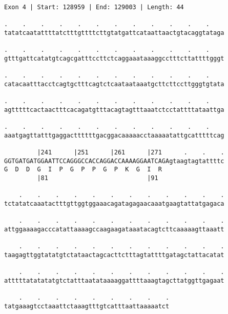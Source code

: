 \documentclass{article}
\begin{document}
\begin{Verbatim}
Exon 4 | Start: 128959 | End: 129003 | Length: 44
 
.    .    .    .    .    .    .    .    .    .    .    .    
tatatcaatattttatctttgttttcttgtatgattcataattaactgtacaggtataga
  
.    .    .    .    .    .    .    .    .    .    .    .    
gtttgattcatatgtcagcgatttccttctcaggaaataaaggcctttcttattttgggt
  
.    .    .    .    .    .    .    .    .    .    .    .    
catacaatttacctcagtgctttcagtctcaataataaatgcttcttccttgggtgtata
  
.    .    .    .    .    .    .    .    .    .    .    .    
agtttttcactaactttcacagatgtttacagtagtttaaatctcctattttataattga
  
.    .    .    .    .    .    .    .    .    .    .    .    
aaatgagttatttgaggacttttttgacggacaaaaacctaaaaatattgcatttttcag
  
         |241      |251      |261      |271      .    .    .
GGTGATGATGGAATTCCAGGGCCACCAGGACCAAAAGGAATCAGAgtaagtagtattttc
G  D  D  G  I  P  G  P  P  G  P  K  G  I  R                 
         |81                           |91                  
  
    .    .    .    .    .    .    .    .    .    .    .    .
tctatatcaaatactttgttggtggaaacagatagagaacaaatgaagtattatgagaca
  
    .    .    .    .    .    .    .    .    .    .    .    .
attggaaaagacccatattaaaagccaagaagataaatacagtcttcaaaaagttaaatt
  
    .    .    .    .    .    .    .    .    .    .    .    .
taagagttggtatatgtctataactagcacttctttagtattttgatagctattacatat
  
    .    .    .    .    .    .    .    .    .    .    .    .
atttttatatatatgtctatttaatataaaaggattttaaagtagcttatggttgagaat
  
    .    .    .    .    .    .    .    .    .
tatgaaagtcctaaattctaaagtttgtcatttaattaaaaatct
\end{Verbatim}
\newpage
\end{document}
